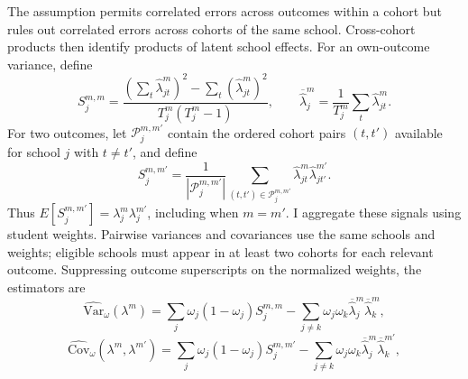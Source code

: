 \documentclass[a4paper, article, english, oneside, unknownkeysallowed, 12pt]{memoir}
\begin{document}
The assumption permits correlated errors across outcomes within a cohort but rules out
correlated errors across cohorts of the same school. Cross-cohort products then identify
products of latent school effects. For an own-outcome variance, define
\begin{equation}
  S_j^{m,m}
  =
  \frac{\left(\sum_t\widehat\lambda_{jt}^m\right)^2-
  \sum_t\left(\widehat\lambda_{jt}^m\right)^2}
  {T_j^m(T_j^m-1)},
  \qquad
  \overline{\widehat\lambda}_j^m
  =
  \frac{1}{T_j^m}\sum_t\widehat\lambda_{jt}^m.
  \label{eq:varcov-school-signal}
\end{equation}
For two outcomes, let $\mathcal P_j^{m,m'}$ contain the ordered cohort pairs $(t,t')$ available
for school $j$ with $t\neq t'$, and define
\begin{equation}
  S_j^{m,m'}
  =
  \frac{1}{|\mathcal P_j^{m,m'}|}
  \sum_{(t,t')\in\mathcal P_j^{m,m'}}
  \widehat\lambda_{jt}^m\widehat\lambda_{jt'}^{m'}.
  \label{eq:varcov-school-cross-signal}
\end{equation}
Thus $E[S_j^{m,m'}]=\lambda_j^m\lambda_j^{m'}$, including when $m=m'$. I aggregate
these signals using student weights. Pairwise variances and covariances use the same schools
and weights; eligible schools must appear in at least two cohorts for each relevant outcome.
Suppressing outcome superscripts on the normalized weights, the estimators are
\begin{equation}
  \widehat{\mathrm{Var}}_{\omega}\left(\lambda^m\right)
  =
  \sum_j \omega_j(1-\omega_j)S_j^{m,m}
  -
  \sum_{j\neq k}\omega_j\omega_k
  \overline{\widehat\lambda}_j^m
  \overline{\widehat\lambda}_k^m,
  \label{eq:varcov-variance}
\end{equation}
\begin{equation}
  \widehat{\mathrm{Cov}}_{\omega}\left(\lambda^m,\lambda^{m'}\right)
  =
  \sum_j \omega_j(1-\omega_j)S_j^{m,m'}
  -
  \sum_{j\neq k}\omega_j\omega_k
  \overline{\widehat\lambda}_j^m
  \overline{\widehat\lambda}_k^{m'},
  \label{eq:varcov-covariance}
\end{equation}
\end{document}
